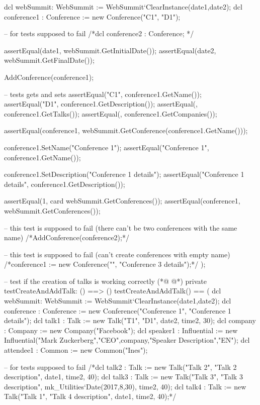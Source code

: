 \begin{vdmpp}[breaklines=true]
  dcl webSummit: WebSummit := WebSummit`ClearInstance(date1,date2);
  dcl conference1 : Conference := new Conference("C1", "D1");
  
  -- for tests supposed to fail
  /*dcl conference2 : Conference; */
  
  assertEqual(date1, webSummit.GetInitialDate());
  assertEqual(date2, webSummit.GetFinalDate());
  
  AddConference(conference1);

   -- tests gets and sets
  assertEqual("C1", conference1.GetName());
  assertEqual("D1", conference1.GetDescription());
  assertEqual({}, conference1.GetTalks());
  assertEqual({}, conference1.GetCompanies());
  
  assertEqual(conference1, webSummit.GetConference(conference1.GetName()));
  
  conference1.SetName("Conference 1");
  assertEqual("Conference 1", conference1.GetName());
  
  conference1.SetDescription("Conference 1 details");
  assertEqual("Conference 1 details", conference1.GetDescription());
  
  assertEqual(1, card webSummit.GetConferences());
  assertEqual({conference1}, webSummit.GetConferences());
  
  -- this test is supposed to fail (there can't be two conferences with the same name)
  /*AddConference(conference2);*/
  
  -- this test is supposed to fail (can't create conferences with empty name)
  /*conference1 := new Conference("", "Conference 3 details");*/
 );
 
 -- test if the creation of talks is working correctly
(*@
\label{testCreateAndAddTalk:107}
@*)
 private testCreateAndAddTalk: () ==> ()
 testCreateAndAddTalk() == (
  dcl webSummit: WebSummit := WebSummit`ClearInstance(date1,date2);
  dcl conference : Conference := new Conference("Conference 1", "Conference 1 details");
  dcl talk1 : Talk := new Talk("T1", "D1", date2, time2, 30);
  dcl company : Company := new Company("Facebook");
  dcl speaker1 : Influential := new Influential("Mark Zuckerberg","CEO",company,"Speaker Description","EN");
  dcl attendee1 : Common := new Common("Ines");
  
  -- for tests supposed to fail
  /*dcl talk2 : Talk := new Talk("Talk 2", "Talk 2 description", date1, time2, 40);
  dcl talk3 : Talk := new Talk("Talk 3", "Talk 3 description", mk_Utilities`Date(2017,8,30), time2, 40);
  dcl talk4 : Talk := new Talk("Talk 1", "Talk 4 description", date1, time2, 40);*/
  

\end{vdmpp}
